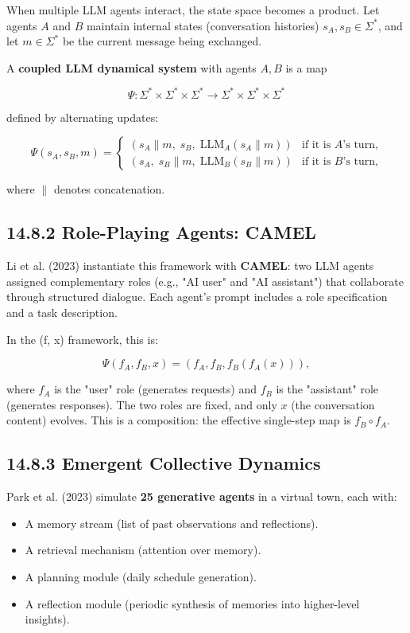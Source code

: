 When multiple LLM agents interact, the state space becomes a product. Let agents $A$ and $B$ maintain internal states (conversation histories) $s_A, s_B \in \Sigma^*$, and let $m \in \Sigma^*$ be the current message being exchanged.

\begin{definition}
A \textbf{coupled LLM dynamical system} with agents $A, B$ is a map

\[
\Psi: \Sigma^* \times \Sigma^* \times \Sigma^* \to \Sigma^* \times \Sigma^* \times \Sigma^*
\]

defined by alternating updates:

\[
\Psi(s_A, s_B, m) = \begin{cases} (s_A \| m, \; s_B, \; \mathrm{LLM}_A(s_A \| m)) & \text{if it is } A\text{'s turn,} \\ (s_A, \; s_B \| m, \; \mathrm{LLM}_B(s_B \| m)) & \text{if it is } B\text{'s turn,} \end{cases}
\]

where $\|$ denotes concatenation.
\end{definition}

\subsection{14.8.2 Role-Playing Agents: CAMEL}

Li et al. (2023) instantiate this framework with \textbf{CAMEL}: two LLM agents assigned complementary roles (e.g., "AI user" and "AI assistant") that collaborate through structured dialogue. Each agent's prompt includes a role specification and a task description.

In the (f, x) framework, this is:

\[
\Psi(f_A, f_B, x) = (f_A, f_B, f_B(f_A(x))),
\]

where $f_A$ is the "user" role (generates requests) and $f_B$ is the "assistant" role (generates responses). The two roles are fixed, and only $x$ (the conversation content) evolves. This is a composition: the effective single-step map is $f_B \circ f_A$.

\subsection{14.8.3 Emergent Collective Dynamics}

Park et al. (2023) simulate \textbf{25 generative agents} in a virtual town, each with:
\begin{itemize}
  \item A memory stream (list of past observations and reflections).
  \item A retrieval mechanism (attention over memory).
  \item A planning module (daily schedule generation).
  \item A reflection module (periodic synthesis of memories into higher-level insights).
\end{itemize}

